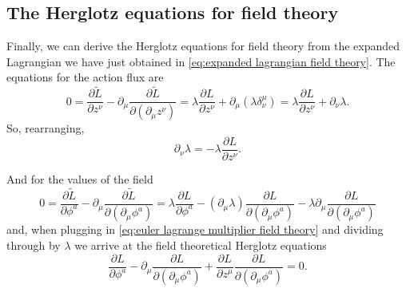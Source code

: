 \documentclass[../main.tex]{subfiles}
\begin{document}
\subsection{The Herglotz equations for field theory}
Finally, we can derive the Herglotz equations for field theory from the expanded
Lagrangian we have just obtained in \cref{eq:expanded lagrangian field theory}. The
equations for the action flux are
\begin{equation*}
	0 = \frac{\partial \tilde{L}}{\partial z^\nu} - \partial_\mu \frac{\partial
	\tilde{L}}{\partial(\partial_\mu z^\nu)} = \lambda \frac{\partial L}{\partial z^\nu} +
	\partial_\mu(\lambda \delta_\nu^\mu) = \lambda \frac{\partial L}{\partial z^\nu} +
	\partial_\nu \lambda.
\end{equation*}
So, rearranging,
\begin{equation} \label{eq:euler lagrange multiplier field theory}
	\partial_\nu \lambda = - \lambda \frac{\partial L}{\partial z^\nu}. 
\end{equation}

And for the values of the field
\begin{equation*}
	0 = \frac{\partial \tilde{L}}{\partial \phi^a} - \partial_\mu \frac{\partial
	\tilde{L}}{\partial(\partial_\mu \phi^a)} = \lambda \frac{\partial L}{\partial \phi^a} -
	(\partial_\mu \lambda) \frac{\partial L}{\partial (\partial_\mu \phi^a) } - \lambda
	\partial_\mu \frac{\partial L}{\partial (\partial_\mu \phi^a) }
\end{equation*}
and, when plugging in \cref{eq:euler lagrange multiplier field theory} and dividing
through by \( \lambda \) we arrive at the field theoretical Herglotz equations
\begin{equation} \label{eq:herglotz field theory}
	\frac{\partial L}{\partial \phi^a} - \partial_\mu \frac{\partial
	L}{\partial(\partial_\mu \phi^a)} + \frac{\partial L}{\partial z^\mu} \frac{\partial
L}{\partial(\partial_\mu \phi^a)} = 0. 
\end{equation}


\end{document}
